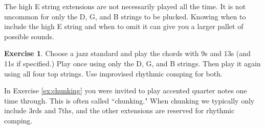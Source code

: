 \documentclass[12pt]{article}
\theoremstyle{definition}
\newtheorem{exercise}{Exercise}
\begin{document}
The high E string extensions are not necessarily played all the time. It is not uncommon for only the D, G, and B strings to be plucked. Knowing when to include the high E string and when to omit it can give you a larger pallet of possible sounds. 

\begin{exercise}
Choose a jazz standard and play the chords with 9s and 13s (and 11s if specified.)
Play once using only the D, G, and B strings. Then play it again using all four top strings. Use improvised rhythmic comping for both. 
\end{exercise}

In Exercise \ref{ex:chunking} you were invited to play accented quarter notes one time through. This is often called ``chunking." When chunking we typically only include 3rds and 7ths, and the other extensions are reserved for rhythmic comping. 
\end{document}
